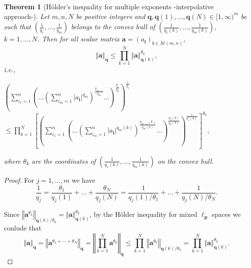 \documentclass[10pt]{amsart}
\newtheorem{theorem}{Theorem}[section]
\numberwithin{equation}{section}
\begin{document}
\begin{theorem}[H\"{o}lder's inequality for multiple exponents
-interpolative approach-]
\label{gen.interp}  Let $m,n,N$ be positive integers and $\mathbf{q},\mathbf{q}(1),\ldots ,\mathbf{q}(N)\in \lbrack 1, \infty )^{m}$ be such that $\left(
\frac{1}{q_{1}},\dots ,\frac{1}{q_{m}}\right) $ belongs to the convex hull
of $\left( \frac{1}{q_{1}(k)},\dots ,\frac{1}{q_{m}(k)}\right) $, $k=1,\ldots ,N$. Then for all scalar matrix $\mathbf{a}=\left( a_{\mathbf{i}}\right) _{\mathbf{i}\in \mathcal{M}(m,n)}$,
\begin{equation*}
\left\Vert \mathbf{a}\right\Vert _{\mathbf{q}}\leq \prod_{k=1}^{N}\left\Vert
\mathbf{a}\right\Vert _{\mathbf{q}(k)}^{\theta _{k}},
\end{equation*}\emph{i.e.},

{\small $\displaystyle
\left( \sum_{i_{1}=1}^{n}\left( \dots \left( \sum_{i_{m}=1}^{n}|a_{\mathbf{i}}|^{q_{m}}\right) ^{\frac{q_{m-1}}{q_{m}}}\dots \right) ^{\frac{q_{1}}{q_{2}}}\right) ^{\frac{1}{q_{1}}}$\newline
$\displaystyle\leq \prod_{k=1}^{N}\left[ \left(\sum_{i_{1}=1}^{n}\left(
\dots \left( \sum_{i_{m}=1}^{n}|a_{\mathbf{i}}|^{q_{m}(k)}\right)^{\frac{q_{m-1}(k)}{q_{m}(k)}}\dots \right) ^{\frac{q_{1}(k)}{q_{2}(k)}}\right) ^{\frac{1}{q_{1}(k)}}\right] ^{\theta _{k}}, $ }

where $\theta _{k}$ are the coordinates of $\left( \frac{1}{q_{1}(k)},\dots ,\frac{1}{q_{m}(k)}\right) $ on the convex hull.
\end{theorem}

\begin{proof}
For $j= 1, \ldots, m$ we have
\begin{equation*}
\frac{1}{q_j} = \frac{\theta_1}{q_j(1)}+ \ldots + \frac{\theta_N}{q_j(N)} =
\frac{1}{q_j(1)/\theta_1}+ \ldots + \frac{1}{q_j(N)/\theta_N}.
\end{equation*}

Since $\left\Vert \mathbf{a}^{\theta _{k}}\right\Vert _{\mathbf{q}(k)/\theta
_{k}}=\left\Vert \mathbf{a}\right\Vert _{\mathbf{q}(k)}^{\theta _{k}}$, by
the H\"{o}lder inequality for mixed $\ell _{\mathbf{p}}$ spaces we conlude
that
\begin{equation*}
\left\Vert \mathbf{a}\right\Vert _{\mathbf{q}}=\left\Vert \mathbf{a}^{\theta
_{1}+\cdots +\theta _{N}}\right\Vert _{\mathbf{q}}=\left\Vert \prod_{k=1}^{N}\mathbf{a}^{\theta _{k}}\right\Vert _{\mathbf{q}}\leq
\prod_{k=1}^{N}\left\Vert \mathbf{a}^{\theta _{k}}\right\Vert _{\mathbf{q}(k)/\theta _{k}}=\prod_{k=1}^{N}\left\Vert \mathbf{a}\right\Vert _{\mathbf{q}(k)}^{\theta _{k}}.
\end{equation*}
\end{proof}
\end{document}
